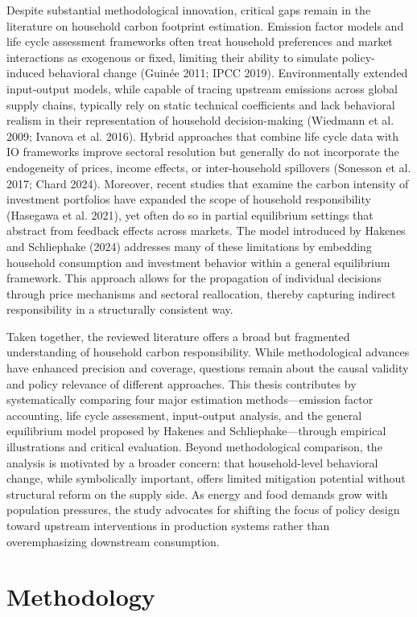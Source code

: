 \documentclass[12pt,a4paper]{article}%
\begin{document}
Despite substantial methodological innovation, critical gaps remain in the literature on household carbon footprint estimation. Emission factor models and life cycle assessment frameworks often treat household preferences and market interactions as exogenous or fixed, limiting their ability to simulate policy-induced behavioral change (Guinée 2011; IPCC 2019). Environmentally extended input-output models, while capable of tracing upstream emissions across global supply chains, typically rely on static technical coefficients and lack behavioral realism in their representation of household decision-making (Wiedmann et al. 2009; Ivanova et al. 2016). Hybrid approaches that combine life cycle data with IO frameworks improve sectoral resolution but generally do not incorporate the endogeneity of prices, income effects, or inter-household spillovers (Sonesson et al. 2017; Chard 2024). Moreover, recent studies that examine the carbon intensity of investment portfolios have expanded the scope of household responsibility (Hasegawa et al. 2021), yet often do so in partial equilibrium settings that abstract from feedback effects across markets. The model introduced by Hakenes and Schliephake (2024) addresses many of these limitations by embedding household consumption and investment behavior within a general equilibrium framework. This approach allows for the propagation of individual decisions through price mechanisms and sectoral reallocation, thereby capturing indirect responsibility in a structurally consistent way.

Taken together, the reviewed literature offers a broad but fragmented understanding of household carbon responsibility. While methodological advances have enhanced precision and coverage, questions remain about the causal validity and policy relevance of different approaches. This thesis contributes by systematically comparing four major estimation methods—emission factor accounting, life cycle assessment, input-output analysis, and the general equilibrium model proposed by Hakenes and Schliephake—through empirical illustrations and critical evaluation. Beyond methodological comparison, the analysis is motivated by a broader concern: that household-level behavioral change, while symbolically important, offers limited mitigation potential without structural reform on the supply side. As energy and food demands grow with population pressures, the study advocates for shifting the focus of policy design toward upstream interventions in production systems rather than overemphasizing downstream consumption.
\section{Methodology}
\lipsum[3-4]
\end{document}
